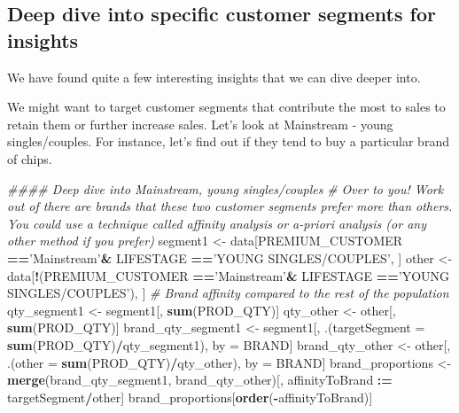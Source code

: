 \documentclass[]{article}
\newenvironment{Shaded}{\begin{snugshade}}{\end{snugshade}}
\newcommand{\CommentTok}[1]{\textcolor[rgb]{0.56,0.35,0.01}{\textit{#1}}}
\newcommand{\DataTypeTok}[1]{\textcolor[rgb]{0.13,0.29,0.53}{#1}}
\newcommand{\ErrorTok}[1]{\textcolor[rgb]{0.64,0.00,0.00}{\textbf{#1}}}
\newcommand{\KeywordTok}[1]{\textcolor[rgb]{0.13,0.29,0.53}{\textbf{#1}}}
\newcommand{\NormalTok}[1]{#1}
\newcommand{\OperatorTok}[1]{\textcolor[rgb]{0.81,0.36,0.00}{\textbf{#1}}}
\newcommand{\StringTok}[1]{\textcolor[rgb]{0.31,0.60,0.02}{#1}}
\begin{document}
\hypertarget{deep-dive-into-specific-customer-segments-for-insights}{%
\subsection{Deep dive into specific customer segments for
insights}\label{deep-dive-into-specific-customer-segments-for-insights}}

We have found quite a few interesting insights that we can dive deeper
into.

We might want to target customer segments that contribute the most to
sales to retain them or further increase sales. Let's look at Mainstream
- young singles/couples. For instance, let's find out if they tend to
buy a particular brand of chips.

\begin{Shaded}
\begin{Highlighting}[]
\CommentTok{#### Deep dive into Mainstream, young singles/couples}
\CommentTok{# Over to you! Work out of there are brands that these two customer segments prefer more than others. You could use a technique called affinity analysis or a-priori analysis (or any other method if you prefer)}
\NormalTok{segment1 <-}\StringTok{ }\NormalTok{data[PREMIUM_CUSTOMER }\OperatorTok{==}\StringTok{'Mainstream'}\OperatorTok{&}
\StringTok{                 }\NormalTok{LIFESTAGE }\OperatorTok{==}\StringTok{'YOUNG SINGLES/COUPLES'}\NormalTok{, ]}
\NormalTok{other <-}\StringTok{ }\NormalTok{data[}\OperatorTok{!}\NormalTok{(PREMIUM_CUSTOMER }\OperatorTok{==}\StringTok{'Mainstream'}\OperatorTok{&}
\StringTok{                 }\NormalTok{LIFESTAGE }\OperatorTok{==}\StringTok{'YOUNG SINGLES/COUPLES'}\NormalTok{), ]}
\CommentTok{# Brand affinity compared to the rest of the population}
\NormalTok{qty_segment1 <-}\StringTok{ }\NormalTok{segment1[, }\KeywordTok{sum}\NormalTok{(PROD_QTY)]}
\NormalTok{qty_other <-}\StringTok{ }\NormalTok{other[, }\KeywordTok{sum}\NormalTok{(PROD_QTY)]}
\NormalTok{brand_qty_segment1 <-}\StringTok{ }\NormalTok{segment1[, .(}\DataTypeTok{targetSegment =} \KeywordTok{sum}\NormalTok{(PROD_QTY)}\OperatorTok{/}\NormalTok{qty_segment1),}
\NormalTok{                              by =}\StringTok{ }\NormalTok{BRAND]}
\NormalTok{brand_qty_other <-}\StringTok{ }\NormalTok{other[, .(}\DataTypeTok{other =} \KeywordTok{sum}\NormalTok{(PROD_QTY)}\OperatorTok{/}\NormalTok{qty_other),}
\NormalTok{                         by =}\StringTok{ }\NormalTok{BRAND]}
\NormalTok{brand_proportions <-}\StringTok{ }\KeywordTok{merge}\NormalTok{(brand_qty_segment1, }
\NormalTok{                           brand_qty_other)[, affinityToBrand }\OperatorTok{:}\ErrorTok{=}\StringTok{ }\NormalTok{targetSegment}\OperatorTok{/}\NormalTok{other]}
\NormalTok{brand_proportions[}\KeywordTok{order}\NormalTok{(}\OperatorTok{-}\NormalTok{affinityToBrand)]}
\end{Highlighting}
\end{Shaded}
\end{document}
